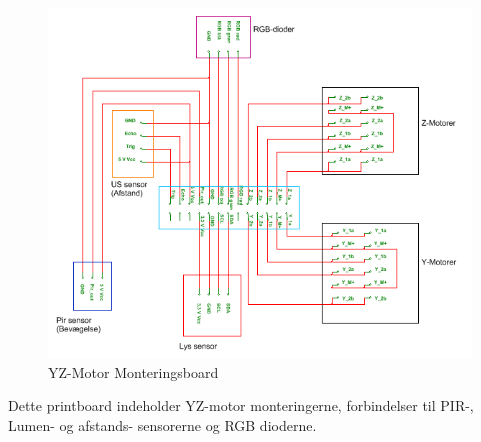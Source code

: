 \begin{figure}[H] \centering
    \includegraphics[width=\linewidth]{0_Filer/Figuer/5_HW_Design/YZVogn.PNG}
    \caption{YZ-Motor Monteringsboard}
    \label{fig:YZVogn}
\end{figure}
Dette printboard indeholder YZ-motor monteringerne, forbindelser til PIR-, Lumen- og afstands- sensorerne og RGB dioderne.